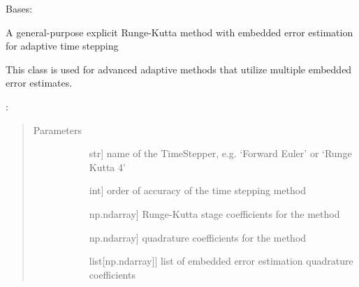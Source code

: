 \documentclass[letterpaper,10pt,english]{sphinxmanual}
\begin{document}
\begin{fulllineitems}
\label{\detokenize{spitfire.time.methods:spitfire.time.methods.GeneralAdaptiveExplicitRungeKuttaMultipleEmbedded}}
Bases: {\hyperref[\detokenize{spitfire.time.methods:spitfire.time.methods.AdaptiveExplicitRungeKutta}]{}}

A general-purpose explicit Runge-Kutta method with embedded error estimation for adaptive time stepping

This class is used for advanced adaptive methods that utilize multiple embedded error estimates.

:
\begin{quote}\begin{description}
\item[{Parameters}] \leavevmode\begin{description}
\item[{}] \leavevmode{[}str{]}
name of the TimeStepper, e.g. ‘Forward Euler’ or ‘Runge Kutta 4’

\item[{}] \leavevmode{[}int{]}
order of accuracy of the time stepping method

\item[{}] \leavevmode{[}np.ndarray{]}
Runge-Kutta stage coefficients for the method

\item[{}] \leavevmode{[}np.ndarray{]}
quadrature coefficients for the method

\item[{}] \leavevmode{[}list{[}np.ndarray{]}{]}
list of embedded error estimation quadrature coefficients

\end{description}

\end{description}\end{quote}


\end{fulllineitems}
\end{document}
